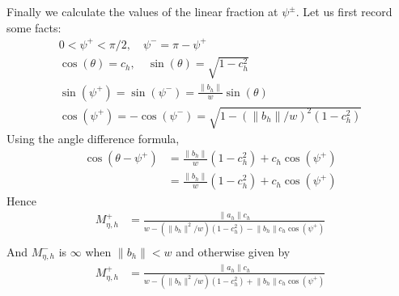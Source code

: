 \documentclass{imsart}
\newcommand{\norm}[1]{\lVert #1 \rVert}
\begin{document}
Finally we calculate the values of the linear fraction at $\psi^{\pm}$. Let us first record some facts:
\begin{align*}
0 < \psi^+ < \pi/2, \quad \psi^- = \pi - \psi^+ \\
\cos(\theta) = c_h, \quad \sin(\theta) = \sqrt{1-c_h^2} \\
\sin(\psi^+) = \sin(\psi^-) = \frac{\norm{b_h}}{w} \sin(\theta) \\
\cos(\psi^+) = -\cos(\psi^-) = \sqrt{1 - (\norm{b_h}/w)^2(1-c_h^2)}
\end{align*}
Using the angle difference formula,
\begin{align*}
\cos(\theta - \psi^+) & = \frac{\norm{b_h}}{w} (1-c_h^2) +  c_h \cos(\psi^+) \\
& = \frac{\norm{b_h}}{w} (1-c_h^2) +  c_h \cos(\psi^+)
\end{align*}
Hence
\begin{align*}
M^+_{\eta, h} & = \frac{ \norm{a_h} c_h }{ w - (\norm{b_h}^2/w) (1-c_h^2) - \norm{b_h} c_h \cos(\psi^+) } \\
\end{align*}
And $M^-_{\eta, h}$ is $\infty$ when $\norm{b_h} < w$ and otherwise given by
\begin{align*}
M^+_{\eta, h} & = \frac{ \norm{a_h} c_h }{ w - (\norm{b_h}^2/w) (1-c_h^2) + \norm{b_h} c_h \cos(\psi^+) } \\
\end{align*}

\end{document}
